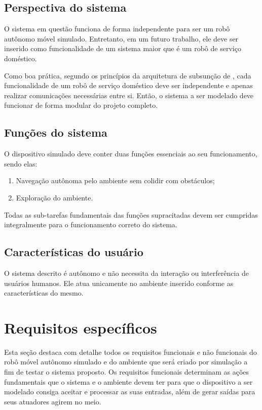 \subsection{Perspectiva do sistema}
O sistema em questão funciona de forma independente para ser um robô autônomo móvel simulado. Entretanto, em um futuro trabalho, ele deve ser inserido como funcionalidade de um sistema maior que é um robô de serviço doméstico. 

Como boa prática, segundo os princípios da arquitetura de subsunção de \citet{brooks85}, cada funcionalidade de um robô de serviço doméstico deve ser independente e apenas realizar comunicações necessárias entre si. Então, o sistema a ser modelado deve funcionar de forma modular do projeto completo.

\subsection{Funções do sistema}
O dispositivo simulado deve conter duas funções essenciais ao seu funcionamento, sendo elas:
\begin{enumerate}
    \item Navegação autônoma pelo ambiente sem colidir com obstáculos;
    \item Exploração do ambiente.
\end{enumerate}
Todas as sub-tarefas fundamentais das funções supracitadas devem ser cumpridas integralmente para o funcionamento correto do sistema.

\subsection{Características do usuário}
O sistema descrito é autônomo e não necessita da interação ou interferência de usuários humanos. Ele atua unicamente no ambiente inserido conforme as características do mesmo.

\section{Requisitos específicos}
Esta seção destaca com detalhe todos os requisitos funcionais e não funcionais do robô móvel autônomo simulado e do ambiente que será criado por simulação a fim de testar o sistema proposto. Os requisitos funcionais determinam as ações fundamentais que o sistema e o ambiente devem ter para que o dispositivo a ser modelado consiga aceitar e processar as suas entradas, além de gerar saídas para seus atuadores agirem no meio. 

